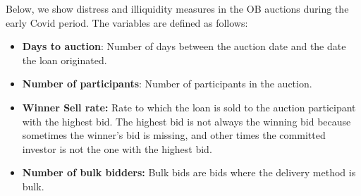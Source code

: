 \documentclass[11pt,a4paper]{article}
\begin{document}
Below, we show distress and illiquidity measures in the OB auctions during the early Covid period. The variables are defined as follows:
\begin{itemize}
\item \textbf{Days to auction}: Number of days between the auction date and the date the loan originated.
\item \textbf{Number of participants}: Number of participants in the auction.
\item  \textbf{Winner Sell rate:} Rate to which the loan is sold to the auction participant with the highest bid. The highest bid is not always the winning bid because sometimes the winner's bid is missing, and other times the committed investor is not the one with the highest bid. 
\item \textbf{Number of bulk bidders:} Bulk bids are bids where the delivery method is bulk.
\end{itemize}
\end{document}
